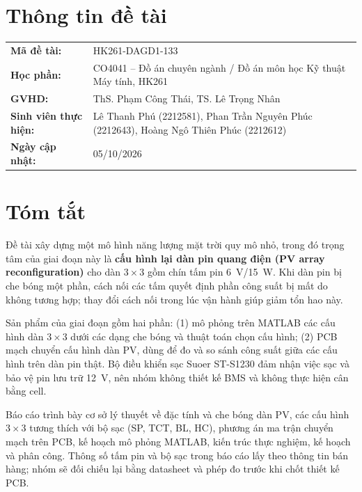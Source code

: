 \section*{Thông tin đề tài}

\noindent\begin{tabular}{@{}p{4.5cm}p{10.5cm}@{}}
\textbf{Mã đề tài:} & HK261-DAGD1-133 \\[2pt]
\textbf{Học phần:} & CO4041 -- Đồ án chuyên ngành / Đồ án môn học Kỹ thuật Máy tính, HK261 \\[2pt]
\textbf{GVHD:} & ThS. Phạm Công Thái, TS. Lê Trọng Nhân \\[2pt]
\textbf{Sinh viên thực hiện:} & Lê Thanh Phú (2212581), Phan Trần Nguyên Phúc (2212643), Hoàng Ngô Thiên Phúc (2212612) \\[2pt]
\textbf{Ngày cập nhật:} & 05/10/2026 \\
\end{tabular}

\section*{Tóm tắt}

Đề tài xây dựng một mô hình năng lượng mặt trời quy mô nhỏ, trong đó trọng tâm của giai đoạn này là \textbf{cấu hình lại dàn pin quang điện (PV array reconfiguration)} cho dàn \(3\times3\) gồm chín tấm pin 6~V/15~W. Khi dàn pin bị che bóng một phần, cách nối các tấm quyết định phần công suất bị mất do không tương hợp; thay đổi cách nối trong lúc vận hành giúp giảm tổn hao này.

Sản phẩm của giai đoạn gồm hai phần: (1) mô phỏng trên MATLAB các cấu hình dàn \(3\times3\) dưới các dạng che bóng và thuật toán chọn cấu hình; (2) PCB mạch chuyển cấu hình dàn PV, dùng để đo và so sánh công suất giữa các cấu hình trên dàn pin thật. Bộ điều khiển sạc Suoer ST-S1230 đảm nhận việc sạc và bảo vệ pin lưu trữ 12~V, nên nhóm không thiết kế BMS và không thực hiện cân bằng cell.

Báo cáo trình bày cơ sở lý thuyết về đặc tính và che bóng dàn PV, các cấu hình \(3\times3\) tương thích với bộ sạc (SP, TCT, BL, HC), phương án ma trận chuyển mạch trên PCB, kế hoạch mô phỏng MATLAB, kiến trúc thực nghiệm, kế hoạch và phân công. Thông số tấm pin và bộ sạc trong báo cáo lấy theo thông tin bán hàng; nhóm sẽ đối chiếu lại bằng datasheet và phép đo trước khi chốt thiết kế PCB.
